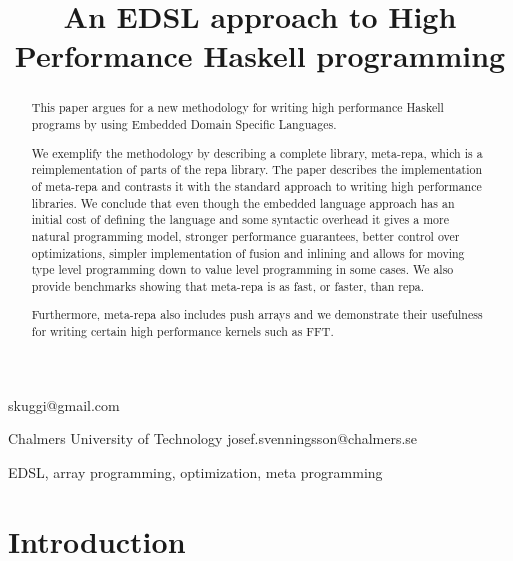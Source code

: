 \documentclass[preprint]{sigplanconf}
\begin{document}
\copyrightdata{[to be supplied]} 


\title{An EDSL approach to High Performance Haskell programming}

           {}
           {skuggi@gmail.com}

           {Chalmers University of Technology}
           {josef.svenningsson@chalmers.se}

\maketitle

\begin{abstract}
This paper argues for a new methodology for writing high performance
Haskell programs by using Embedded Domain Specific Languages. 

We exemplify the methodology by describing a complete library,
meta-repa, which is a reimplementation of parts of the repa
library. The paper describes the implementation of meta-repa and
contrasts it with the standard approach to writing high performance
libraries. We conclude that even though the embedded language approach
has an initial cost of defining the language and some syntactic
overhead it gives a more natural programming model, stronger
performance guarantees, better control over optimizations, simpler
implementation of fusion and inlining and allows for moving type level
programming down to value level programming in some cases. We also
provide benchmarks showing that meta-repa is as fast, or faster, than
repa.

Furthermore, meta-repa also includes push arrays and we demonstrate
their usefulness for writing certain high performance kernels such as
FFT.
\end{abstract}



\keywords
EDSL, array programming, optimization, meta programming

\section{Introduction}
\end{document}
